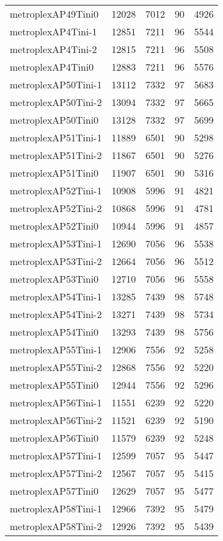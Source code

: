 \begin{longtable}{lrrrr}
metroplexAP49Tini0 & 12028 & 7012 & 90 & 4926 \\
metroplexAP4Tini-1 & 12851 & 7211 & 96 & 5544 \\
metroplexAP4Tini-2 & 12815 & 7211 & 96 & 5508 \\
metroplexAP4Tini0 & 12883 & 7211 & 96 & 5576 \\
metroplexAP50Tini-1 & 13112 & 7332 & 97 & 5683 \\
metroplexAP50Tini-2 & 13094 & 7332 & 97 & 5665 \\
metroplexAP50Tini0 & 13128 & 7332 & 97 & 5699 \\
metroplexAP51Tini-1 & 11889 & 6501 & 90 & 5298 \\
metroplexAP51Tini-2 & 11867 & 6501 & 90 & 5276 \\
metroplexAP51Tini0 & 11907 & 6501 & 90 & 5316 \\
metroplexAP52Tini-1 & 10908 & 5996 & 91 & 4821 \\
metroplexAP52Tini-2 & 10868 & 5996 & 91 & 4781 \\
metroplexAP52Tini0 & 10944 & 5996 & 91 & 4857 \\
metroplexAP53Tini-1 & 12690 & 7056 & 96 & 5538 \\
metroplexAP53Tini-2 & 12664 & 7056 & 96 & 5512 \\
metroplexAP53Tini0 & 12710 & 7056 & 96 & 5558 \\
metroplexAP54Tini-1 & 13285 & 7439 & 98 & 5748 \\
metroplexAP54Tini-2 & 13271 & 7439 & 98 & 5734 \\
metroplexAP54Tini0 & 13293 & 7439 & 98 & 5756 \\
metroplexAP55Tini-1 & 12906 & 7556 & 92 & 5258 \\
metroplexAP55Tini-2 & 12868 & 7556 & 92 & 5220 \\
metroplexAP55Tini0 & 12944 & 7556 & 92 & 5296 \\
metroplexAP56Tini-1 & 11551 & 6239 & 92 & 5220 \\
metroplexAP56Tini-2 & 11521 & 6239 & 92 & 5190 \\
metroplexAP56Tini0 & 11579 & 6239 & 92 & 5248 \\
metroplexAP57Tini-1 & 12599 & 7057 & 95 & 5447 \\
metroplexAP57Tini-2 & 12567 & 7057 & 95 & 5415 \\
metroplexAP57Tini0 & 12629 & 7057 & 95 & 5477 \\
metroplexAP58Tini-1 & 12966 & 7392 & 95 & 5479 \\
metroplexAP58Tini-2 & 12926 & 7392 & 95 & 5439 \\

\end{longtable}
